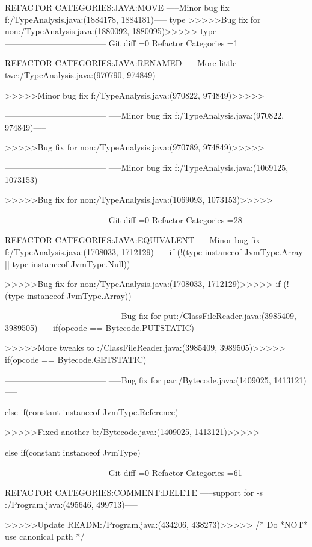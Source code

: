 REFACTOR CATEGORIES:JAVA:MOVE
-----Minor bug fix f:/TypeAnalysis.java:(1884178, 1884181)-----
type
>>>>>Bug fix for non:/TypeAnalysis.java:(1880092, 1880095)>>>>>
type
------------------------------------
Git diff =0  Refactor Categories =1

REFACTOR CATEGORIES:JAVA:RENAMED
-----More little twe:/TypeAnalysis.java:(970790, 974849)-----
{
	
>>>>>Minor bug fix f:/TypeAnalysis.java:(970822, 974849)>>>>>
{
	
------------------------------------
-----Minor bug fix f:/TypeAnalysis.java:(970822, 974849)-----
{
	
>>>>>Bug fix for non:/TypeAnalysis.java:(970789, 974849)>>>>>
{
	
------------------------------------
-----Minor bug fix f:/TypeAnalysis.java:(1069125, 1073153)-----
{
	
>>>>>Bug fix for non:/TypeAnalysis.java:(1069093, 1073153)>>>>>
{
	
------------------------------------
Git diff =0  Refactor Categories =28

REFACTOR CATEGORIES:JAVA:EQUIVALENT
-----Minor bug fix f:/TypeAnalysis.java:(1708033, 1712129)-----
		if (!(type instanceof JvmType.Array || type instanceof JvmType.Null)) {
	
>>>>>Bug fix for non:/TypeAnalysis.java:(1708033, 1712129)>>>>>
		if (!(type instanceof JvmType.Array)) {
	
------------------------------------
-----Bug fix for put:/ClassFileReader.java:(3985409, 3989505)-----
			if(opcode == Bytecode.PUTSTATIC) {
	
>>>>>More tweaks to :/ClassFileReader.java:(3985409, 3989505)>>>>>
			if(opcode == Bytecode.GETSTATIC) {
	
------------------------------------
-----Bug fix for par:/Bytecode.java:(1409025, 1413121)-----
			} else if(constant instanceof JvmType.Reference) {
	
>>>>>Fixed another b:/Bytecode.java:(1409025, 1413121)>>>>>
			} else if(constant instanceof JvmType) {
	
------------------------------------
Git diff =0  Refactor Categories =61

REFACTOR CATEGORIES:COMMENT:DELETE
-----support for -s :/Program.java:(495646, 499713)-----

	
>>>>>Update READM:/Program.java:(434206, 438273)>>>>>
 /* Do *NOT* use canonical path */
	
}}}}}}}}}}
